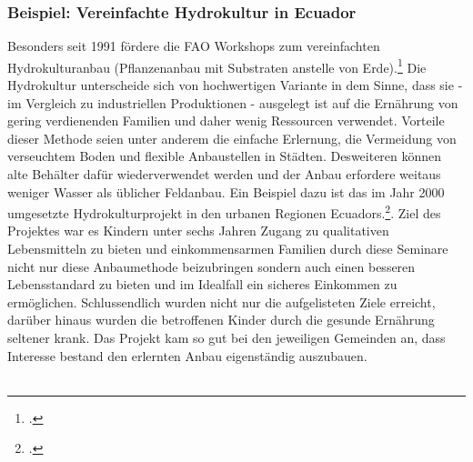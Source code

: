 \documentclass{scrartcl}
\begin{document}
\subsubsection*{Beispiel: Vereinfachte Hydrokultur in Ecuador}
Besonders seit 1991 fördere die FAO Workshops zum vereinfachten Hydrokulturanbau (Pflanzenanbau mit Substraten anstelle von Erde).\footcites[Vgl.][o.P. (S.1)]{Stajano2003SIMPLIFIEDEcuador} Die  Hydrokultur unterscheide sich von hochwertigen Variante in dem Sinne, dass sie - im Vergleich zu industriellen Produktionen - ausgelegt ist auf die Ernährung von gering verdienenden Familien und daher wenig Ressourcen verwendet. Vorteile dieser Methode seien unter anderem die einfache Erlernung, die Vermeidung von verseuchtem Boden und flexible Anbaustellen in Städten. Desweiteren können alte Behälter dafür wiederverwendet werden und der Anbau erfordere weitaus weniger Wasser als üblicher Feldanbau. Ein Beispiel dazu ist das im Jahr 2000 umgesetzte Hydrokulturprojekt in den urbanen Regionen Ecuadors.\footcite[Vgl.][o.P. (S.2f)]{Stajano2003SIMPLIFIEDEcuador}. Ziel des Projektes war es Kindern unter sechs Jahren Zugang zu qualitativen Lebensmitteln zu bieten und einkommensarmen Familien durch diese Seminare nicht nur diese Anbaumethode beizubringen sondern auch einen besseren Lebensstandard zu bieten und im Idealfall ein sicheres Einkommen zu ermöglichen. Schlussendlich wurden nicht nur die aufgelisteten Ziele erreicht, darüber hinaus wurden die betroffenen Kinder durch die gesunde Ernährung seltener krank. Das Projekt kam so gut bei den jeweiligen Gemeinden an, dass Interesse bestand den erlernten Anbau eigenständig auszubauen. \\
\\
\end{document}
